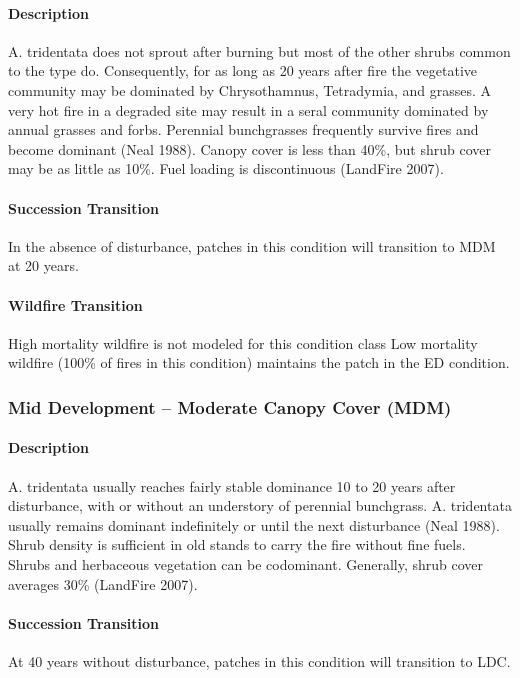 \paragraph{Description} A. tridentata does not sprout after burning but most of the other shrubs common to the type do. Consequently, for as long as 20 years after fire the vegetative community may be dominated by Chrysothamnus, Tetradymia, and grasses. A very hot fire in a degraded site may result in a seral community dominated by annual grasses and forbs. Perennial bunchgrasses frequently survive fires and become dominant (Neal 1988). Canopy cover is less than 40\%, but shrub cover may be as little as 10\%. Fuel loading is discontinuous (LandFire 2007).

\paragraph{Succession Transition} In the absence of disturbance, patches in this condition will transition to MDM at 20 years. 

\paragraph{Wildfire Transition} High mortality wildfire is not modeled for this condition class Low mortality wildfire (100\% of fires in this condition) maintains the patch in the ED condition. 

\hrulefill


\subsubsection{Mid Development – Moderate Canopy Cover (MDM)}

\paragraph{Description} A. tridentata usually reaches fairly stable dominance 10 to 20 years after disturbance, with or without an understory of perennial bunchgrass. A. tridentata usually remains dominant indefinitely or until the next disturbance (Neal 1988). Shrub density is sufficient in old stands to carry the fire without fine fuels. Shrubs and herbaceous vegetation can be codominant. Generally, shrub cover averages 30\% (LandFire 2007).

\paragraph{Succession Transition} At 40 years without disturbance, patches in this condition will transition to LDC. 

